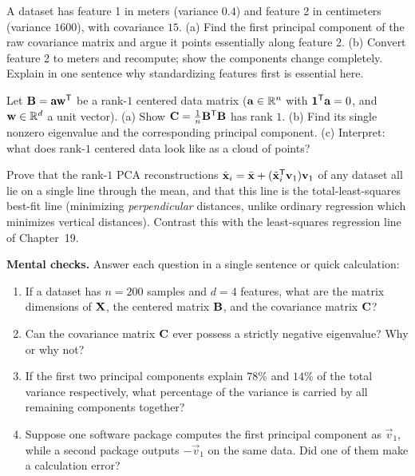 \begin{exercise}\label{ch30:ex-units}
A dataset has feature 1 in meters (variance $0.4$) and feature 2 in centimeters
(variance $1600$), with covariance $15$. (a) Find the first principal component of
the raw covariance matrix and argue it points essentially along feature 2.
(b) Convert feature 2 to meters and recompute; show the components change
completely. Explain in one sentence why standardizing features first is essential
here.
\end{exercise}

\begin{exercise}\label{ch30:ex-rank1}
Let $\mathbf{B}=\mathbf{a}\mathbf{w}^{\mathsf{T}}$ be a rank-$1$ centered data matrix ($\mathbf{a}\in\mathbb{R}^n$
with $\mathbf{1}^{\mathsf{T}}\mathbf{a}=0$, and $\mathbf{w}\in\mathbb{R}^d$ a unit vector). (a) Show $\mathbf{C}=\tfrac1n\mathbf{B}^{\mathsf{T}}\mathbf{B}$ has rank $1$. (b) Find its single nonzero eigenvalue and
the corresponding principal component. (c) Interpret: what does rank-$1$ centered
data look like as a cloud of points?
\end{exercise}

\begin{exercise}\label{ch30:ex-recon-line}
Prove that the rank-$1$ PCA reconstructions $\hat{\mathbf{x}}_i=\bar{\mathbf{x}}+(\tilde{\mathbf{x}}_i^{\mathsf{T}}\mathbf{v}_1)\mathbf{v}_1$ of any dataset all lie on a single line
through the mean, and that this line is the total-least-squares best-fit line
(minimizing \emph{perpendicular} distances, unlike ordinary regression which
minimizes vertical distances). Contrast this with the least-squares regression line
of Chapter~19.
\end{exercise}

\begin{exercise}\label{ch30:ex-mental}
\textbf{Mental checks.} Answer each question in a single sentence or quick calculation:
\begin{enumerate}[label=(\alph*)]
  \item If a dataset has $n=200$ samples and $d=4$ features, what are the matrix
        dimensions of $\mathbf{X}$, the centered matrix $\mathbf{B}$, and the covariance
        matrix $\mathbf{C}$?
  \item Can the covariance matrix $\mathbf{C}$ ever possess a strictly negative
        eigenvalue? Why or why not?
  \item If the first two principal components explain $78\%$ and $14\%$ of the
        total variance respectively, what percentage of the variance is carried by
        all remaining components together?
  \item Suppose one software package computes the first principal component as
        $\vec v_1$, while a second package outputs $-\vec v_1$ on the same data.
        Did one of them make a calculation error?
\end{enumerate}
\end{exercise}
